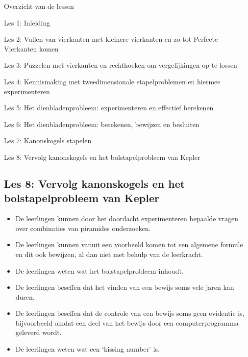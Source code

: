 \documentclass[dutch]{beamer}
\begin{document}
\begin{frame}
{Overzicht van de lessen}
\begin{list}{\quad}{}
\item Les 1: Inleiding
\item Les 2: Vullen van vierkanten met kleinere vierkanten en zo tot Perfecte Vierkanten komen
\item Les 3: Puzzelen met vierkanten en rechthoeken om vergelijkingen op te lossen
\item Les 4: Kennismaking met tweedimensionale stapelproblemen en hiermee experimenteren
\item Les 5: Het dienbladenprobleem: experimenteren en effectief berekenen
\item Les 6: Het dienbladenprobleem: berekenen, bewijzen en besluiten
\item Les 7: Kanonskogels stapelen
\item {\color{blue}Les 8: Vervolg kanonskogels en het bolstapelprobleem van Kepler}
\end{list}
\end{frame}

\subsection{Les 8: Vervolg kanonskogels en het bolstapelprobleem van Kepler}

\begin{frame}
\begin{itemize}
\item De leerlingen kunnen door het doordacht experimenteren bepaalde vragen over combinaties van piramides onderzoeken.
\item De leerlingen kunnen vanuit een voorbeeld komen tot een algemene formule en dit ook bewijzen, al dan niet met behulp van de leerkracht.
\item De leerlingen weten wat het bolstapelprobleem inhoudt.
\item De leerlingen beseffen dat het vinden van een bewijs soms vele jaren kan duren.
\item De leerlingen beseffen dat de controle van een bewijs soms geen evidentie is, bijvoorbeeld omdat een deel van het bewijs door een computerprogramma geleverd wordt.
\item De leerlingen weten wat een `kissing number' is.
\end{itemize}
\end{frame}
\end{document}
